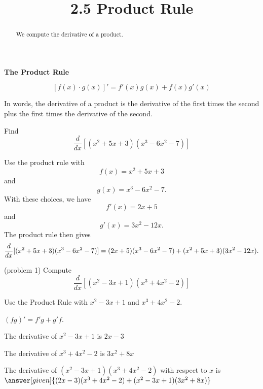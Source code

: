 \documentclass{ximera}
\title{2.5 Product Rule}
\begin{document}
\begin{abstract}
We compute the derivative of a product.
\end{abstract}

\maketitle


\begin{center}
\bf{The Product Rule}
\end{center}


\[[f(x) \cdot g(x)]' = f'(x)g(x) + f(x)g'(x)\]

In words, the derivative of a product is the derivative of the first times the second plus the first 
times the derivative of the second.\\

\begin{example}[example 1]
Find 
\[
\frac{d}{dx} [(x^2 + 5x+3)(x^3 - 6x^2 -7)]
\]

Use the product rule with 
\[
f(x) = x^2 + 5x+3
\]
and
\[
g(x) = x^3 -6x^2 -7.
\]
With these choices, we have
\[
f'(x) = 2x + 5
\]
and 
\[
g'(x) = 3x^2 - 12x.
\]
The product rule then gives
\[
\frac{d}{dx} [(x^2 + 5x+3)(x^3 - 6x^2 -7)]\\
=(2x+5)(x^3-6x^2 -7) + (x^2 + 5x+3)(3x^2 -12x).
\]
\end{example}


\begin{problem} (problem 1)
  Compute
  \[
  \frac{d}{dx}[(x^2 - 3x +1)(x^3 + 4x^2 -2)]
  \]
  
    \begin{hint}
      Use the Product Rule with $x^2 -3x+1$ and $x^3 +4x^2-2$.
    \end{hint}
    \begin{hint}
      $(fg)' = f'g+g'f$.
    \end{hint}
    \begin{hint}
      The derivative of $x^2 -3x+1$ is $2x-3$
    \end{hint}
    \begin{hint}
      The derivative of $x^3 + 4x^2 -2$ is $3x^2 +8x$
    \end{hint}
    
		The derivative of $(x^2 - 3x +1)(x^3 + 4x^2 -2)$ with respect to $x$ is
		 $\answer[given]{(2x-3)(x^3+4x^2-2)+(x^2-3x+1)(3x^2+8x)}$
		
\end{problem}
\end{document}
